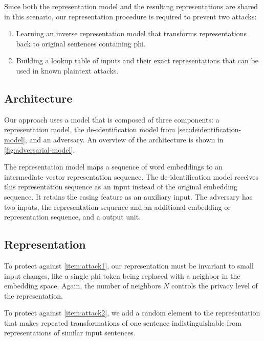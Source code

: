 %
Since both the representation model and the resulting representations are shared in this scenario, our representation procedure is required to prevent two attacks:
%
\begin{enumerate}[label=A\arabic*.,ref=A\arabic*]
    \item Learning an inverse representation model that transforms representations back to original sentences containing \ac{phi}.\label{item:attack1}
    \item Building a lookup table of inputs and their exact representations that can be used in known plaintext attacks.\label{item:attack2}
\end{enumerate}

\subsection{Architecture}
%
Our approach uses a model that is composed of three components: a representation model, the de-identification model from \cref{sec:deidentification-model}, and an adversary.
%
An overview of the architecture is shown in \cref{fig:adversarial-model}.

%
The representation model maps a sequence of word embeddings to an intermediate vector representation sequence.
%
The de-identification model receives this representation sequence as an input instead of the original embedding sequence.
%
It retains the casing feature as an auxiliary input.
%
The adversary has two inputs, the representation sequence and an additional embedding or representation sequence, and a output unit.

\subsection{Representation}
%
To protect against \ref{item:attack1}, our representation must be invariant to small input changes, like a single \ac{phi} token being replaced with a neighbor in the embedding space.
%
Again, the number of neighbors $N$ controls the privacy level of the representation.

%
To protect against \ref{item:attack2}, we add a random element to the representation that makes repeated transformations of one sentence indistinguishable from representations of similar input sentences.


